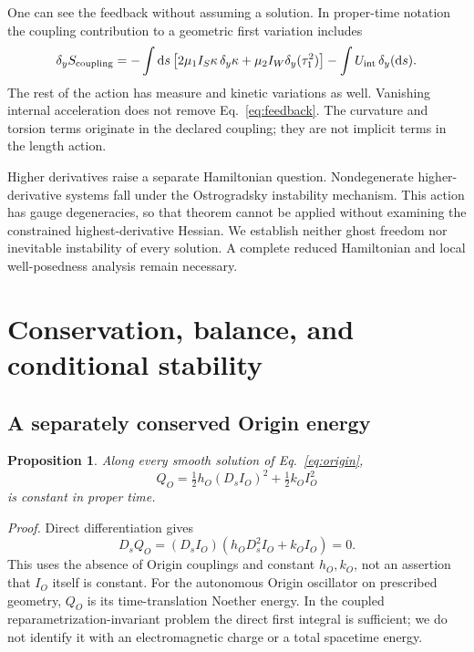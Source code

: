 \documentclass[11pt]{article}
\newcommand{\dd}{\mathrm d}
\newcommand{\Ds}{D_s}
\newcommand{\U}{U_{\mathrm{int}}}
\newtheorem{proposition}{Proposition}
\begin{document}
One can see the feedback without assuming a solution. In proper-time notation the coupling contribution to a geometric first variation includes
\begin{equation}
 \delta_y S_{\rm coupling}
 =-\int\dd s\left[2\mu_1 I_S\kappa\,\delta_y\kappa
       +\mu_2 I_W\delta_y(\tau_1^2)\right]
   -\int \U\,\delta_y(\dd s).
 \label{eq:feedback}
\end{equation}
The rest of the action has measure and kinetic variations as well. Vanishing internal acceleration does not remove Eq.~\eqref{eq:feedback}. The curvature and torsion terms originate in the declared coupling; they are not implicit terms in the length action.

Higher derivatives raise a separate Hamiltonian question. Nondegenerate higher-derivative systems fall under the Ostrogradsky instability mechanism.\cite{woodard} This action has gauge degeneracies, so that theorem cannot be applied without examining the constrained highest-derivative Hessian. We establish neither ghost freedom nor inevitable instability of every solution. A complete reduced Hamiltonian and local well-posedness analysis remain necessary.

\section{Conservation, balance, and conditional stability}
\subsection{A separately conserved Origin energy}
\begin{proposition}
Along every smooth solution of Eq.~\eqref{eq:origin},
\begin{equation}
 Q_O=\tfrac12 h_O(\Ds I_O)^2+\tfrac12 k_O I_O^2
 \label{eq:Q}
\end{equation}
is constant in proper time.
\end{proposition}
\textit{Proof.} Direct differentiation gives
\begin{equation}
 \Ds Q_O=(\Ds I_O)(h_O\Ds^2 I_O+k_O I_O)=0.
\end{equation}
This uses the absence of Origin couplings and constant $h_O,k_O$, not an assertion that $I_O$ itself is constant. For the autonomous Origin oscillator on prescribed geometry, $Q_O$ is its time-translation Noether energy.\cite{noether} In the coupled reparametrization-invariant problem the direct first integral is sufficient; we do not identify it with an electromagnetic charge or a total spacetime energy.
\end{document}
